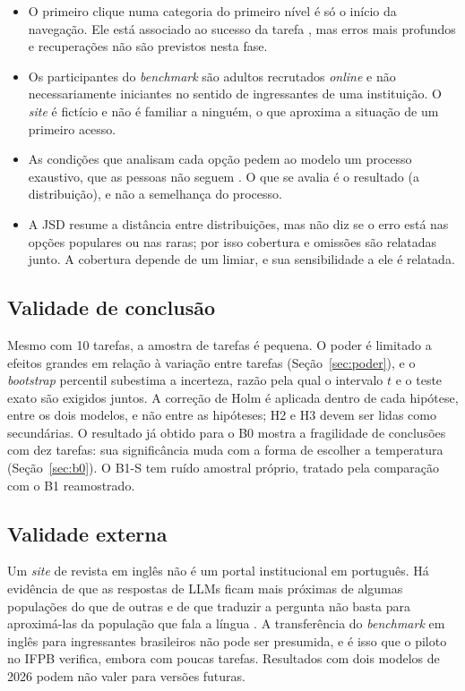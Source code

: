 \documentclass[12pt,oneside,a4paper,chapter=TITLE,english,brazil]{abntex2}
\begin{document}
\begin{itemize}
\item O primeiro clique numa categoria do primeiro nível é só o início da navegação. Ele está associado ao sucesso da tarefa \cite{bailey2009firstclick}, mas erros mais profundos e recuperações não são previstos nesta fase.
\item Os participantes do \textit{benchmark} são adultos recrutados \textit{online} e não necessariamente iniciantes no sentido de ingressantes de uma instituição. O \textit{site} é fictício e não é familiar a ninguém, o que aproxima a situação de um primeiro acesso.
\item As condições que analisam cada opção pedem ao modelo um processo exaustivo, que as pessoas não seguem \cite{brumby2008strategies}. O que se avalia é o resultado (a distribuição), e não a semelhança do processo.
\item A JSD resume a distância entre distribuições, mas não diz se o erro está nas opções populares ou nas raras; por isso cobertura e omissões são relatadas junto. A cobertura depende de um limiar, e sua sensibilidade a ele é relatada.
\end{itemize}

\subsection{Validade de conclusão}

Mesmo com 10 tarefas, a amostra de tarefas é pequena. O poder é limitado a efeitos grandes em relação à variação entre tarefas (Seção~\ref{sec:poder}), e o \textit{bootstrap} percentil subestima a incerteza, razão pela qual o intervalo $t$ e o teste exato são exigidos juntos. A correção de Holm é aplicada dentro de cada hipótese, entre os dois modelos, e não entre as hipóteses; H2 e H3 devem ser lidas como secundárias. O resultado já obtido para o B0 mostra a fragilidade de conclusões com dez tarefas: sua significância muda com a forma de escolher a temperatura (Seção~\ref{sec:b0}). O B1-S tem ruído amostral próprio, tratado pela comparação com o B1 reamostrado.

\subsection{Validade externa}

Um \textit{site} de revista em inglês não é um portal institucional em português. Há evidência de que as respostas de LLMs ficam mais próximas de algumas populações do que de outras \cite{santurkar2023whose,durmus2023globalopinions} e de que traduzir a pergunta não basta para aproximá-las da população que fala a língua \cite{durmus2023globalopinions}. A transferência do \textit{benchmark} em inglês para ingressantes brasileiros não pode ser presumida, e é isso que o piloto no IFPB verifica, embora com poucas tarefas. Resultados com dois modelos de 2026 podem não valer para versões futuras.
\end{document}
